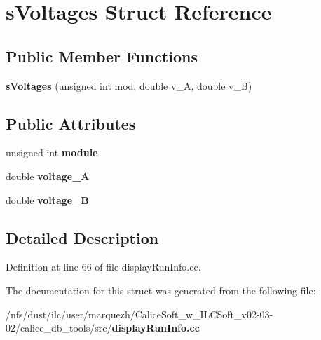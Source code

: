 \section{s\-Voltages Struct Reference}
\label{structsVoltages}
\subsection*{Public Member Functions}
\begin{DoxyCompactItemize}
\item 
{\bfseries s\-Voltages} (unsigned int mod, double v\-\_\-\-A, double v\-\_\-\-B)\label{structsVoltages_abd71bedce816007146b3185cf1941e77}

\end{DoxyCompactItemize}
\subsection*{Public Attributes}
\begin{DoxyCompactItemize}
\item 
unsigned int {\bfseries module}\label{structsVoltages_a467add2524f32aa080c2e2e91f6c0669}

\item 
double {\bfseries voltage\-\_\-\-A}\label{structsVoltages_acee26f5fd14bf3e58b65d736bd40d9aa}

\item 
double {\bfseries voltage\-\_\-\-B}\label{structsVoltages_ae2e8a6ec429c790474887aaaefd821bb}

\end{DoxyCompactItemize}


\subsection{Detailed Description}


Definition at line 66 of file display\-Run\-Info.\-cc.



The documentation for this struct was generated from the following file\-:\begin{DoxyCompactItemize}
\item 
/nfs/dust/ilc/user/marquezh/\-Calice\-Soft\-\_\-w\-\_\-\-I\-L\-C\-Soft\-\_\-v02-\/03-\/02/calice\-\_\-db\-\_\-tools/src/{\bf display\-Run\-Info.\-cc}\end{DoxyCompactItemize}
